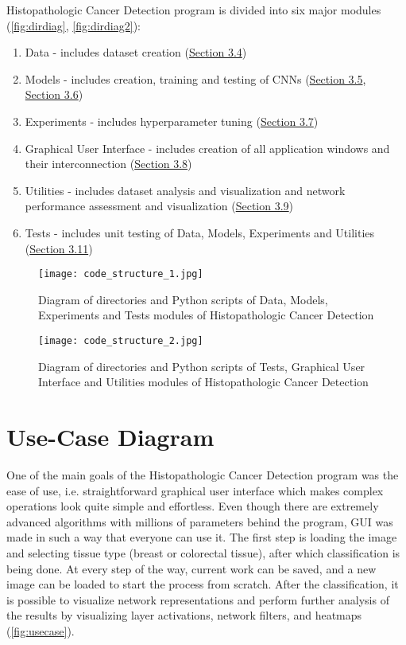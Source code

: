 Histopathologic Cancer Detection program is divided into six major modules (\textcolor{red}{\autoref{fig:dirdiag}}, \textcolor{red}{\autoref{fig:dirdiag2}}):
\begin{enumerate}
	\itemsep 0em
	\item Data - includes dataset creation (\textcolor{red}{\hyperref[createdata]{Section 3.4}})
	\item Models - includes creation, training and testing of CNNs (\textcolor{red}{\hyperref[cnn]{Section 3.5}\textcolor{black}{,} \\ \hyperref[vgg19]{Section 3.6}})
	\item Experiments - includes hyperparameter tuning (\textcolor{red}{\hyperref[exp]{Section 3.7}})
	\item Graphical User Interface - includes creation of all application windows and their interconnection (\textcolor{red}{\hyperref[gui]{Section 3.8}})
	\item Utilities - includes dataset analysis and visualization and network performance assessment and visualization (\textcolor{red}{\hyperref[utils]{Section 3.9}})
	\item Tests - includes unit testing of Data, Models, Experiments and Utilities (\textcolor{red}{\hyperref[tests]{Section 3.11}})
\end{enumerate}

\begin{figure}[h]
	\centering
	\texttt{[image: code\_structure\_1.jpg]}
	\caption{Diagram of directories and Python scripts of Data, Models, Experiments and Tests modules of Histopathologic Cancer Detection}
	\label{fig:dirdiag}
\end{figure}

\clearpage

\begin{figure}[h]
	\centering
	\texttt{[image: code\_structure\_2.jpg]}
	\caption{Diagram of directories and Python scripts of Tests, Graphical User Interface and Utilities modules of Histopathologic Cancer Detection}
	\label{fig:dirdiag2}
\end{figure}

\section{Use-Case Diagram}

One of the main goals of the Histopathologic Cancer Detection program was the ease of use, i.e. straightforward graphical user interface which makes complex operations look quite simple and effortless. Even though there are extremely advanced algorithms with millions of parameters behind the program, GUI was made in such a way that everyone can use it. The first step is loading the image and selecting tissue type (breast or colorectal tissue), after which classification is being done. At every step of the way, current work can be saved, and a new image can be loaded to start the process from scratch. After the classification, it is possible to visualize network representations and perform further analysis of the results by visualizing layer activations, network filters, and heatmaps (\textcolor{red}{\autoref{fig:usecase}}).

